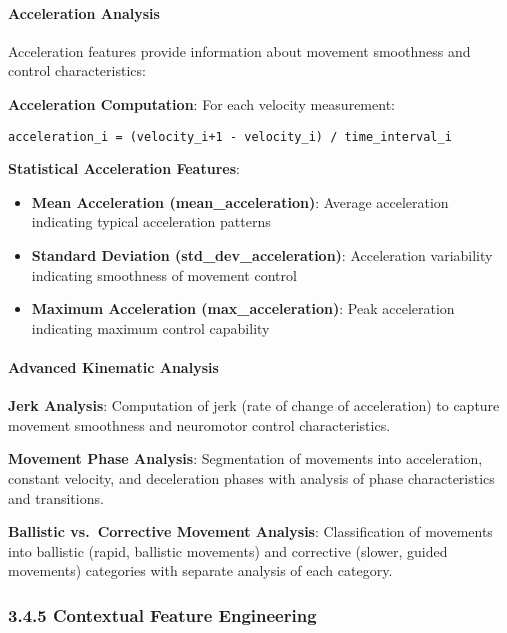 \documentclass[
  11pt,
  a4paper,
]{article}
\providecommand{\tightlist}{%
  \setlength{\itemsep}{0pt}\setlength{\parskip}{0pt}}
\begin{document}
\paragraph{Acceleration Analysis}\label{acceleration-analysis}

Acceleration features provide information about movement smoothness and
control characteristics:

\textbf{Acceleration Computation}: For each velocity measurement:

\begin{verbatim}
acceleration_i = (velocity_i+1 - velocity_i) / time_interval_i
\end{verbatim}

\textbf{Statistical Acceleration Features}:

\begin{itemize}
\tightlist
\item
  \textbf{Mean Acceleration (mean\_acceleration)}: Average acceleration
  indicating typical acceleration patterns
\item
  \textbf{Standard Deviation (std\_dev\_acceleration)}: Acceleration
  variability indicating smoothness of movement control
\item
  \textbf{Maximum Acceleration (max\_acceleration)}: Peak acceleration
  indicating maximum control capability
\end{itemize}

\paragraph{Advanced Kinematic
Analysis}\label{advanced-kinematic-analysis}

\textbf{Jerk Analysis}: Computation of jerk (rate of change of
acceleration) to capture movement smoothness and neuromotor control
characteristics.

\textbf{Movement Phase Analysis}: Segmentation of movements into
acceleration, constant velocity, and deceleration phases with analysis
of phase characteristics and transitions.

\textbf{Ballistic vs.~Corrective Movement Analysis}: Classification of
movements into ballistic (rapid, ballistic movements) and corrective
(slower, guided movements) categories with separate analysis of each
category.

\subsubsection{3.4.5 Contextual Feature
Engineering}\label{contextual-feature-engineering}
\end{document}
